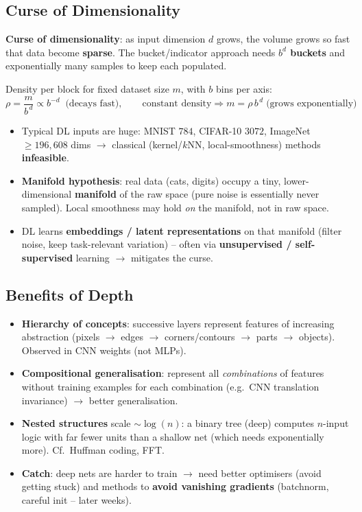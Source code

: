 \documentclass[10pt,a4paper]{article}
\begin{document}
	\subsection{Curse of Dimensionality}

	\begin{definitionbox}
		\textbf{Curse of dimensionality}: as input dimension $d$ grows, the volume grows so fast that data become \textbf{sparse}. The bucket/indicator approach needs \textbf{$b^d$ buckets} and exponentially many samples to keep each populated.
	\end{definitionbox}

	\begin{formulabox}
		Density per block for fixed dataset size $m$, with $b$ bins per axis:
		\[
		\rho = \frac{m}{b^{\,d}} \propto b^{-d} \;\;\text{(decays fast)}, \qquad
		\text{constant density} \Rightarrow m = \rho\, b^{\,d}\;\text{(grows exponentially)}
		\]
	\end{formulabox}
	\begin{itemize}[leftmargin=*]
		\item Typical DL inputs are huge: MNIST $784$, CIFAR-10 $3072$, ImageNet $\geq196{,}608$ dims $\rightarrow$ classical (kernel/$k$NN, local-smoothness) methods \textbf{infeasible}.
		\item \textbf{Manifold hypothesis}: real data (cats, digits) occupy a tiny, lower-dimensional \textbf{manifold} of the raw space (pure noise is essentially never sampled). Local smoothness may hold \emph{on} the manifold, not in raw space.
		\item DL learns \textbf{embeddings / latent representations} on that manifold (filter noise, keep task-relevant variation) -- often via \textbf{unsupervised / self-supervised} learning $\rightarrow$ mitigates the curse.
	\end{itemize}

	\subsection{Benefits of Depth}

	\begin{itemize}[leftmargin=*]
		\item \textbf{Hierarchy of concepts}: successive layers represent features of increasing abstraction (pixels $\to$ edges $\to$ corners/contours $\to$ parts $\to$ objects). Observed in CNN weights (not MLPs).
		\item \textbf{Compositional generalisation}: represent all \emph{combinations} of features without training examples for each combination (e.g.\ CNN translation invariance) $\rightarrow$ better generalisation.
		\item \textbf{Nested structures} scale $\sim\log(n)$: a binary tree (deep) computes $n$-input logic with far fewer units than a shallow net (which needs exponentially more). Cf.\ Huffman coding, FFT.
		\item \textbf{Catch}: deep nets are harder to train $\rightarrow$ need better optimisers (avoid getting stuck) and methods to \textbf{avoid vanishing gradients} (batchnorm, careful init -- later weeks).
	\end{itemize}
\end{document}
